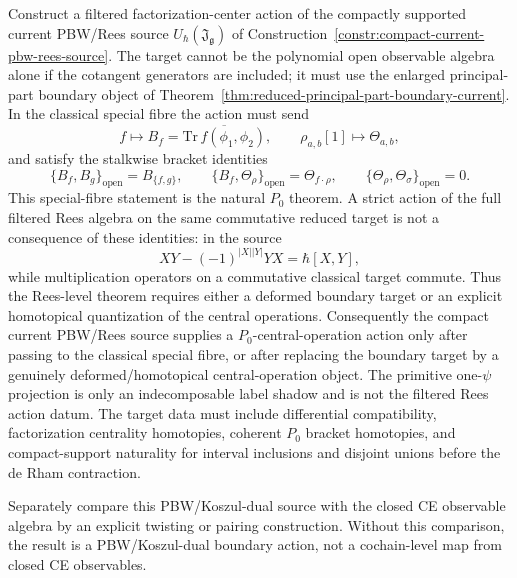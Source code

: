 \documentclass[11pt]{memoir}
\begin{document}
\begin{prob}\label{prob:pbw-p0-center-action}
  Construct a filtered factorization-center action of the compactly
  supported current PBW/Rees source
  $U_\hbar(\mathfrak J_{\mathfrak g})$ of
  Construction~\ref{constr:compact-current-pbw-rees-source}. The target cannot
  be the polynomial open observable algebra alone if the cotangent generators
  are included; it must use the enlarged principal-part boundary object of
  Theorem~\ref{thm:reduced-principal-part-boundary-current}. In the
  classical special fibre the action must send
  $$f\longmapsto B_f=\overline{\mathrm{Tr}\,f(\phi_1,\phi_2)},\qquad
    \rho_{a,b}[1]\longmapsto\Theta_{a,b},$$
  and satisfy the stalkwise bracket identities
  $$\{B_f,B_g\}_{\mathrm{open}}=B_{\{f,g\}},\qquad
    \{B_f,\Theta_\rho\}_{\mathrm{open}}=\Theta_{f\cdot\rho},\qquad
    \{\Theta_\rho,\Theta_\sigma\}_{\mathrm{open}}=0.$$
  This special-fibre statement is the natural \(P_0\) theorem. A strict action
  of the full filtered Rees algebra on the same commutative reduced target is
  not a consequence of these identities: in the source
  $$XY-(-1)^{|X||Y|}YX=\hbar[X,Y],$$
  while multiplication operators on a commutative classical target commute.
  Thus the Rees-level theorem requires either a deformed boundary target or an
  explicit homotopical quantization of the central operations.  Consequently
  the compact current PBW/Rees source supplies a \(P_0\)-central-operation
  action only after passing to the classical special fibre, or after
  replacing the boundary target by a genuinely deformed/homotopical
  central-operation object.  The primitive one-\(\psi\) projection is
  only an indecomposable label shadow and is not the filtered Rees action
  datum.
  The target data must include differential compatibility, factorization
  centrality homotopies, coherent $P_0$ bracket homotopies, and
  compact-support naturality for interval inclusions and disjoint unions before
  the de Rham contraction.

  Separately compare this PBW/Koszul-dual source with the closed CE observable
  algebra by an explicit twisting or pairing construction. Without this
  comparison, the result is a PBW/Koszul-dual boundary action, not a
  cochain-level map from closed CE observables.
\end{prob}
\end{document}
